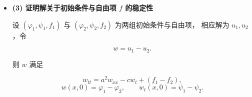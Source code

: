 \begin{solution}
\begin{itemize}
\[
\begin{cases}
w_{tt}=a^{2}w_{xx}-cw_t,\\[4pt]
w(0,t)=w(l,t)=0,\\[4pt]
w(x,0)=0,\quad w_t(x,0)=0.
\end{cases}
\]

对 $w$ 的能量

\[
E_w(t)=\int_0^l \left( w_t^2 + a^2 w_x^2\right)dx
\]

由上一问的证明可知

\[
\frac{dE_w(t)}{dt} \le 0, \qquad  E_w(0)=0.
\]

因此对所有 $t>0$，

\[
0 \le E_w(t) \le E_w(0)=0.
\]

故

\[
w_t=w_x\equiv 0,\quad w\equiv 0,
\]

从而

\[
u_1\equiv u_2.
\]

这说明方程的解是唯一的。

\begin{definition}[解关于初始条件与自由项的稳定性]
设波动方程的两组初始数据分别为
\[
(\varphi_1,\psi_1,f_1), \qquad (\varphi_2,\psi_2,f_2),
\]
对应解为 $u_1,u_2$。令差
\[
w=u_1-u_2 .
\]

若对任意 $t>0$，存在常数 $C>0$，使得
\[
\|w(\cdot,t)\|_{H^1(0,l)}^{2}
+\|w_t(\cdot,t)\|_{L^2(0,l)}^{2}
\le 
C\Big( 
\|\varphi_1-\varphi_2\|_{H^1(0,l)}^{2}
+\|\psi_1-\psi_2\|_{L^2(0,l)}^{2}
+\int_{0}^{t}\|f_1-f_2\|_{L^2(0,l)}^{2}\, d\tau
\Big),
\]
则称波动方程的解对初始条件与自由项 $f$ 是稳定的。

该条件也可写成能量形式：
\[
E_w(t)
\le 
C\left(
E_w(0) 
+ \int_{0}^{t} \|f_1-f_2\|_{L^2(0,l)}^{2} d\tau
\right),
\]
其中
\[
E_w(t)=\int_{0}^{l}\left(w_t^{2}+a^{2}w_x^{2}\right)\,dx
\]
为差函数 $w$ 在时刻 $t$ 的能量。
\end{definition}
\begin{dxtips}
    若初始差与右端项差足够小，则在任意有限时间内，两个解的差也保持小。
\end{dxtips}
\item \textbf{(3) 证明解关于初始条件与自由项 $f$ 的稳定性}

设 $(\varphi_1,\psi_1,f_1)$ 与 $(\varphi_2,\psi_2,f_2)$ 为两组初始条件与自由项，
相应解为 $u_1,u_2$，令

\[
w=u_1-u_2.
\]

则 $w$ 满足

\[
w_{tt}=a^{2}w_{xx}-cw_t + (f_1-f_2),
\]
\[
w(x,0)=\varphi_1-\varphi_2,\qquad w_t(x,0)=\psi_1-\psi_2.
\]


\end{itemize}
\end{solution}
